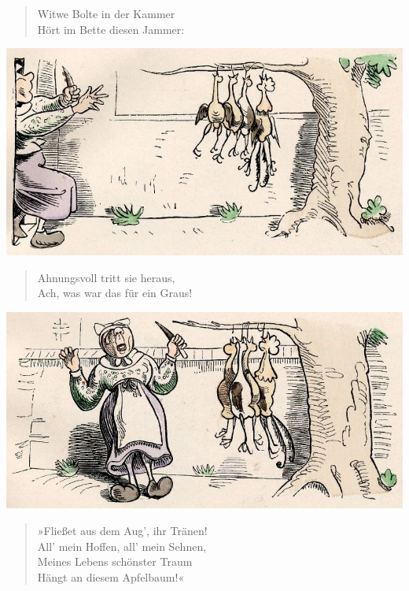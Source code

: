 \documentclass[a4paper,12pt]{article}
\begin{document}
\begin{verse}
Witwe Bolte in der Kammer\\{}
Hört im Bette diesen Jammer:
\end{verse}



\begin{center}\includegraphics[scale=.7, alt={... tritt heraus}]{images/1-12.jpg}\end{center}



\begin{verse}
Ahnungsvoll tritt sie heraus,\\{}
Ach, was war das für ein Graus!
\end{verse}



\begin{center}\includegraphics[scale=.7, alt={... und trauert}]{images/1-13.jpg}\end{center}



\begin{verse}
»Fließet aus dem Aug', ihr Tränen!\\{}
All' mein Hoffen, all' mein Sehnen,\\{}
Meines Lebens schönster Traum\\{}
Hängt an diesem Apfelbaum!«
\end{verse}
\end{document}
